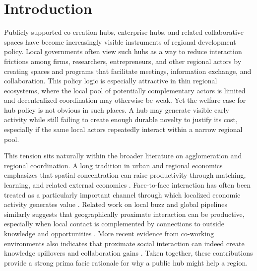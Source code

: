 \section{Introduction}
\label{sec:intro}

Publicly supported co-creation hubs, enterprise hubs, and related collaborative spaces have become increasingly visible instruments of regional development policy. Local governments often view such hubs as a way to reduce interaction frictions among firms, researchers, entrepreneurs, and other regional actors by creating spaces and programs that facilitate meetings, information exchange, and collaboration. This policy logic is especially attractive in thin regional ecosystems, where the local pool of potentially complementary actors is limited and decentralized coordination may otherwise be weak. Yet the welfare case for hub policy is not obvious in such places. A hub may generate visible early activity while still failing to create enough durable novelty to justify its cost, especially if the same local actors repeatedly interact within a narrow regional pool.

This tension sits naturally within the broader literature on agglomeration and regional coordination. A long tradition in urban and regional economics emphasizes that spatial concentration can raise productivity through matching, learning, and related external economies \citep{DurantonPuga2004,RosenthalStrange2004}. Face-to-face interaction has often been treated as a particularly important channel through which localized economic activity generates value \citep{StorperVenables2004}. Related work on local buzz and global pipelines similarly suggests that geographically proximate interaction can be productive, especially when local contact is complemented by connections to outside knowledge and opportunities \citep{BatheltMalmbergMaskell2004}. More recent evidence from co-working environments also indicates that proximate social interaction can indeed create knowledge spillovers and collaboration gains \citep{RocheOettlCatalini2024}. Taken together, these contributions provide a strong prima facie rationale for why a public hub might help a region.

